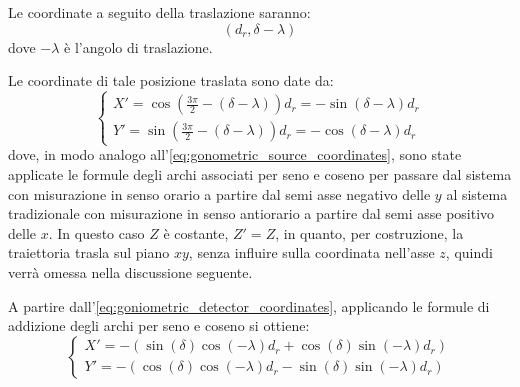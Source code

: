 \documentclass[12pt,a4paper]{report}
\begin{document}
Le coordinate a seguito della traslazione saranno:
\begin{equation*}
  (d_r, \delta - \lambda)
\end{equation*}
dove \(-\lambda\) è l'angolo di traslazione.

Le coordinate di tale posizione traslata sono date da:
\begin{equation} \label{eq:goniometric_detector_coordinates}
  \begin{cases}
    X' = \cos(\frac{3\pi}{2} - (\delta - \lambda)) d_r = -\sin(\delta - \lambda) d_r \\
    Y' = \sin(\frac{3\pi}{2} - (\delta - \lambda)) d_r = -\cos(\delta - \lambda) d_r
  \end{cases}
\end{equation}
dove, in modo analogo all'\autoref{eq:gonometric_source_coordinates}, sono state applicate le formule degli archi associati per
seno e coseno per passare dal sistema con misurazione in senso orario a partire dal semi asse negativo delle \(y\) al sistema
tradizionale con misurazione in senso antiorario a partire dal semi asse positivo delle \(x\).
In questo caso \(Z\) è costante, \(Z' = Z\), in quanto, per costruzione, la traiettoria trasla sul piano \(xy\), senza influire
sulla coordinata nell'asse \(z\), quindi verrà omessa nella discussione seguente.

A partire dall'\autoref{eq:goniometric_detector_coordinates}, applicando le formule di addizione degli archi per seno e coseno si
ottiene:
\begin{equation*}
  \begin{cases}
    X' = - (\sin(\delta)\cos(-\lambda) d_r + \cos(\delta)\sin(-\lambda) d_r) \\
    Y' = - (\cos(\delta)\cos(-\lambda) d_r - \sin(\delta)\sin(-\lambda) d_r)
  \end{cases}
\end{equation*}
\end{document}

